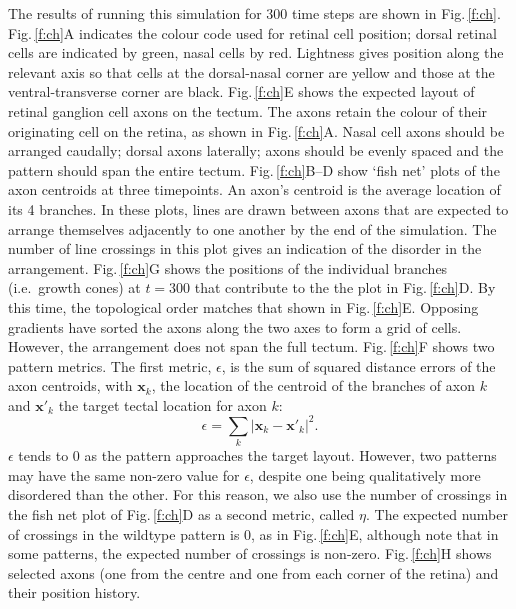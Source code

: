 \documentclass[11pt, a4paper]{article}
\begin{document}
The results of running this simulation for 300 time steps are shown in
Fig.\,\ref{f:ch}. Fig.\,\ref{f:ch}A indicates the colour code used for retinal
cell position; dorsal retinal cells are indicated by green, nasal cells by
red. Lightness gives position along the relevant axis so that cells at the
dorsal-nasal corner are yellow and those at the ventral-transverse corner are
black. Fig.\,\ref{f:ch}E shows the expected layout of retinal ganglion cell
axons on the tectum. The axons retain the colour of their originating cell on
the retina, as shown in Fig.\,\ref{f:ch}A. Nasal cell axons should be arranged
caudally; dorsal axons laterally; axons should be evenly spaced and the
pattern should span the entire tectum.  Fig.\,\ref{f:ch}B--D show `fish net'
plots of the axon centroids at three timepoints. An axon's centroid is the
average location of its 4 branches. In these plots, lines are drawn between
axons that are expected to arrange themselves adjacently to one another by the
end of the simulation. The number of line crossings in this plot gives an
indication of the disorder in the arrangement. Fig.\,\ref{f:ch}G shows the
positions of the individual branches (i.e.~growth cones) at $t=300$ that
contribute to the the plot in Fig.\,\ref{f:ch}D. By this time, the topological
order matches that shown in Fig.\,\ref{f:ch}E. Opposing gradients have sorted
the axons along the two axes to form a grid of cells. However, the arrangement
does not span the full tectum. Fig.\,\ref{f:ch}F shows two pattern
metrics. The first metric, $\epsilon$, is the sum of squared distance errors
of the axon centroids, with $\mathbf{x}_{k}$, the location of the centroid of
the branches of axon $k$ and $\mathbf{x}'_{k}$ the target tectal location for
axon $k$:
%
\begin{equation}\label{e:eps}
\epsilon = \sum_k |\mathbf{x}_{k} - \mathbf{x}'_{k}|^2.
\end{equation}
%
$\epsilon$ tends to 0 as the pattern approaches the target layout. However,
two patterns may have the same non-zero value for $\epsilon$, despite one
being qualitatively more disordered than the other. For this reason, we also
use the number of crossings in the fish net plot of Fig.\,\ref{f:ch}D as a
second metric, called $\eta$. The expected number of crossings in the wildtype
pattern is 0, as in Fig.\,\ref{f:ch}E, although note that in some patterns,
the expected number of crossings is non-zero. Fig.\,\ref{f:ch}H shows selected
axons (one from the centre and one from each corner of the retina) and their
position history.
\end{document}
